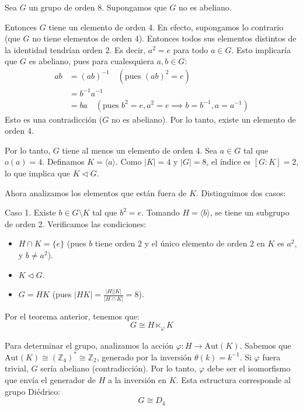 \begin{eje}
Sea $G$ un grupo de orden 8. Supongamos que $G$ no es abeliano.

Entonces $G$ tiene un elemento de orden 4.
En efecto, supongamos lo contrario (que $G$ no tiene elementos de orden 4). Entonces todos sus elementos distintos de la identidad tendrían orden 2. Es decir, $a^2 = e$ para todo $a \in G$.
Esto implicaría que $G$ es abeliano, pues para cualesquiera $a, b \in G$:
\begin{align*}
ab &= (ab)^{-1} \quad (\text{pues } (ab)^2=e) \\
&= b^{-1}a^{-1} \\
&= ba \quad (\text{pues } b^2=e, a^2=e \implies b=b^{-1}, a=a^{-1})
\end{align*}
Esto es una contradicción ($G$ no es abeliano). Por lo tanto, existe un elemento de orden 4.

Por lo tanto, $G$ tiene al menos un elemento de orden 4.
Sea $a \in G$ tal que $o(a)=4$. Definamos $K = \langle a \rangle$.
Como $|K|=4$ y $|G|=8$, el índice es $[G:K]=2$, lo que implica que $K \triangleleft G$.

Ahora analizamos los elementos que están fuera de $K$. Distinguimos dos casos:

Caso 1. Existe $b \in G \setminus K$ tal que $b^2 = e$.
Tomando $H = \langle b \rangle$, se tiene un subgrupo de orden 2.
Verificamos las condiciones:
\begin{itemize}
    \item $H \cap K = \{e\}$ (pues $b$ tiene orden 2 y el único elemento de orden 2 en $K$ es $a^2$, y $b \neq a^2$).
    \item $K \triangleleft G$.
    \item $G = HK$ (pues $|HK| = \frac{|H||K|}{|H \cap K|} = 8$).
\end{itemize}
Por el teorema anterior, tenemos que:
\begin{equation*}
G \cong H \ltimes_{\varphi} K
\end{equation*}

Para determinar el grupo, analizamos la acción $\varphi: H \to \text{Aut}(K)$.
Sabemos que $\text{Aut}(K) \cong (\mathbb{Z}_4)^\ast \cong \mathbb{Z}_2$, generado por la inversión $\theta(k) = k^{-1}$.
Si $\varphi$ fuera trivial, $G$ sería abeliano (contradicción).
Por lo tanto, $\varphi$ debe ser el isomorfismo que envía el generador de $H$ a la inversión en $K$.
Esta estructura corresponde al grupo Diédrico:
\begin{equation*}
G \cong D_4
\end{equation*}


\end{eje}
